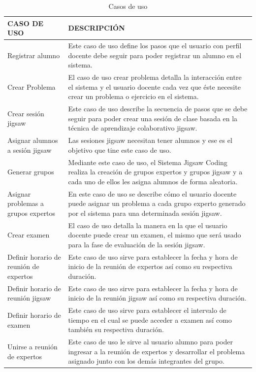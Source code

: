 \begin{longtable}{L{4cm}L{9cm}}
	\caption{Casos de uso}
	\label{tab:das_casosdeuso}\\
	\toprule[0.8mm]
	CASO DE USO & DESCRIPCIÓN \\
	\midrule[0.6mm]
	Registrar alumno & Este caso de uso define los pasos que el usuario con perfil docente debe seguir para poder registrar un alumno en el sistema.\\
	\midrule
	Crear Problema & El caso de uso crear problema detalla la interacción entre el sistema y el usuario docente cada vez que éste necesite crear un problema o ejercicio en el sistema.\\
	\midrule
	Crear sesión jigsaw & Este caso de uso describe la secuencia de pasos que se debe seguir para poder crear una sesión de clase basada en la técnica de aprendizaje colaborativo jigsaw.\\
	\midrule
	Asignar alumnos a sesión jigsaw & Las sesiones jigsaw necesitan tener alumnos y ese es el objetivo que tine este caso de uso.\\
	\midrule
	Generar grupos & Mediante este caso de uso, el Sistema Jigsaw Coding realiza la creación de grupos expertos y grupos jigsaw y a cada uno de ellos les asigna alumnos de forma aleatoria.\\
	\midrule
	Asignar problemas a grupos expertos & En este caso de uso se describe cómo el usuario docente puede asignar un problema a cada grupo experto generado por el sistema para una determinada sesión jigsaw.\\
	\midrule
	Crear examen & El caso de uso detalla la manera en la que el usuario docente puede crear un examen, el mismo que será usado para la fase de evaluación de la sesión jigsaw.\\
	\midrule
	Definir horario de reunión de expertos & Este caso de uso sirve para establecer la fecha y hora de inicio de la reunión de expertos así como su respectiva duración.\\
	\midrule
	Definir horario de reunión jigsaw & Este caso de uso sirve para establecer la fecha y hora de inicio de la reunión jigsaw así como su respectiva duración.\\
	\midrule
	Definir horario de examen & Este caso de uso sirve para establecer el intervalo de tiempo en el cual se puede acceder a examen así como también su respectiva duración.\\
	\midrule
	Unirse a reunión de expertos & Este caso de uso le sirve al usuario alumno para poder ingresar a la reunión de expertos y desarrollar el problema asignado junto con los demás integrantes del grupo.\\

\end{longtable}
